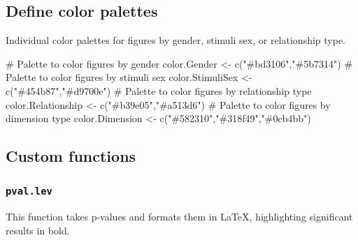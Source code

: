 \documentclass[
  bookmarksnumbered]{article}
\newenvironment{Shaded}{\begin{snugshade}}{\end{snugshade}}
\newcommand{\CommentTok}[1]{\textcolor[rgb]{0.50,0.62,0.50}{#1}}
\newcommand{\FunctionTok}[1]{\textcolor[rgb]{0.94,0.94,0.56}{#1}}
\newcommand{\NormalTok}[1]{\textcolor[rgb]{0.80,0.80,0.80}{#1}}
\newcommand{\OtherTok}[1]{\textcolor[rgb]{0.94,0.94,0.56}{#1}}
\newcommand{\StringTok}[1]{\textcolor[rgb]{0.80,0.58,0.58}{#1}}
\begin{document}
\hypertarget{define-color-palettes}{%
\subsection{Define color palettes}\label{define-color-palettes}}

Individual color palettes for figures by gender, stimuli sex, or relationship type.

\begin{Shaded}
\begin{Highlighting}[]
\CommentTok{\# Palette to color figures by gender}
\NormalTok{color.Gender }\OtherTok{\textless{}{-}} \FunctionTok{c}\NormalTok{(}\StringTok{"\#bd3106"}\NormalTok{,}\StringTok{"\#5b7314"}\NormalTok{)}
\CommentTok{\# Palette to color figures by stimuli sex}
\NormalTok{color.StimuliSex }\OtherTok{\textless{}{-}} \FunctionTok{c}\NormalTok{(}\StringTok{"\#454b87"}\NormalTok{,}\StringTok{"\#d9700e"}\NormalTok{)}
\CommentTok{\# Palette to color figures by relationship type}
\NormalTok{color.Relationship }\OtherTok{\textless{}{-}} \FunctionTok{c}\NormalTok{(}\StringTok{"\#b39e05"}\NormalTok{,}\StringTok{"\#a513d6"}\NormalTok{)}
\CommentTok{\# Palette to color figures by dimension type}
\NormalTok{color.Dimension }\OtherTok{\textless{}{-}} \FunctionTok{c}\NormalTok{(}\StringTok{"\#582310"}\NormalTok{,}\StringTok{"\#318f49"}\NormalTok{,}\StringTok{"\#0cb4bb"}\NormalTok{)}
\end{Highlighting}
\end{Shaded}

\hypertarget{custom-functions}{%
\subsection{Custom functions}\label{custom-functions}}

\hypertarget{pval.lev}{%
\subsubsection{\texorpdfstring{\texttt{pval.lev}}{pval.lev}}\label{pval.lev}}

This function takes p-values and formats them in \LaTeX, highlighting significant results in bold.
\end{document}
